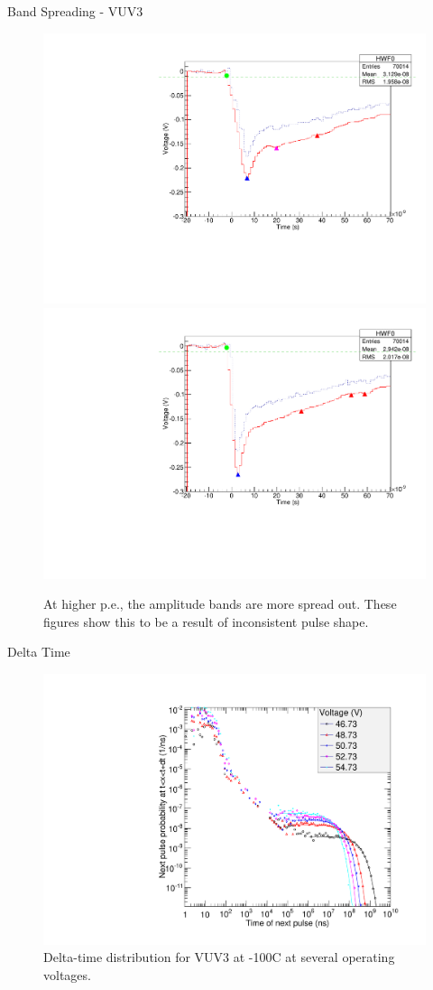 \documentclass{beamer}
\begin{document}
\begin{frame}{Band Spreading - VUV3}
\begin{figure}
\centering
\includegraphics[height=0.38\textwidth]{peak_low.pdf}%
\includegraphics[height=0.38\textwidth]{peak_high.pdf}
\caption{At higher p.e., the amplitude bands are more spread out. These figures show this to be a result of inconsistent pulse shape.}
\end{figure}
\end{frame}

\begin{frame}{Delta Time}
\begin{figure}
\centering
\includegraphics[height=0.5\textwidth]{deltatime.pdf}
\caption{Delta-time distribution for VUV3 at -100C at several operating voltages.}
\end{figure}
\end{frame}
\end{document}
